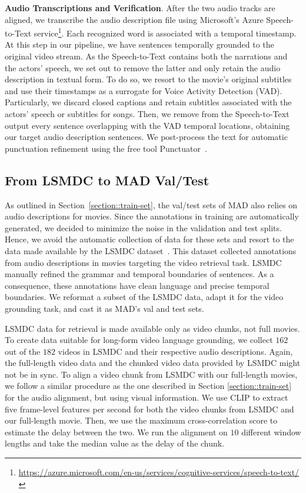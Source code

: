 \documentclass[10pt,twocolumn,letterpaper]{article}
\renewcommand{\paragraph}[1]{\vspace{1mm}\noindent\textbf{#1}.}
\begin{document}
\paragraph{Audio Transcriptions and Verification}
After the two audio tracks are aligned, we transcribe the audio description file using Microsoft's Azure Speech-to-Text service\footnote{\url{https://azure.microsoft.com/en-us/services/cognitive-services/speech-to-text/}}. Each recognized word is associated with a temporal timestamp. At this step in our pipeline, we have sentences temporally grounded to the original video stream. As the Speech-to-Text contains both the narrations and the actors' speech, we set out to remove the latter and only retain the audio description in textual form.
To do so, we resort to the movie's original subtitles and use their timestamps as a surrogate for Voice Activity Detection (VAD). Particularly, we discard closed captions and retain subtitles associated with the actors' speech or subtitles for songs. Then, we remove from the Speech-to-Text output every sentence overlapping with the VAD temporal locations, obtaining our target audio description sentences. We post-process the text for automatic punctuation refinement using the free tool Punctuator~\cite{tilk2016}. 


\subsection{From LSMDC to MAD Val/Test}
\label{section::test-set}
As outlined in Section~\ref{section::train-set}, the val/test sets of MAD also relies on audio descriptions for movies. Since the annotations in training  are automatically generated, we decided to minimize the noise in the validation and test splits. Hence, we avoid the automatic collection of data for these sets and resort to the data made available by the LSMDC dataset~\cite{rohrbach2017movie}. This dataset collected annotations from audio descriptions in movies targeting the video retrieval task. LSMDC manually refined the grammar and temporal boundaries of sentences. As a consequence, these annotations have clean language and precise temporal boundaries. We reformat a subset of the LSMDC data, adapt it for the video grounding task, and cast it as MAD's val and test sets.

LSMDC data for retrieval is made available only as video chunks, not full movies. To create data suitable for long-form video language grounding, we collect $162$ out of the $182$ videos in LSMDC and their respective audio descriptions. Again, the full-length video data and the chunked video data provided by LSMDC might not be in sync. To align a video chunk from LSMDC with our full-length movies, we follow a similar procedure as the one described in Section \ref{section::train-set} for the audio alignment, but using visual information. We use CLIP \cite{radford2021learning} to extract five frame-level features per second for both the video chunks from LSMDC and our full-length movie. Then, we use the maximum cross-correlation score to estimate the delay between the two. We run the alignment on $10$ different window lengths and take the median value as the delay of the chunk. 
\end{document}
